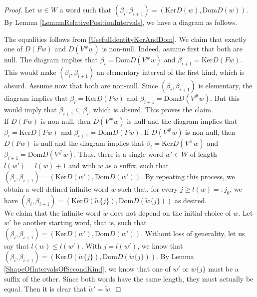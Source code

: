 \documentclass[12pt]{amsart}
\theoremstyle{definition}
\renewcommand{\tilde}{\widetilde}
\newcommand{\<}{\langle}   %
\renewcommand{\>}{\rangle} %
\begin{document}
\begin{proof}
    Let $w \in W$ a word such that $(\beta_i,\beta_{i+1}) = (\mathrm{Ker}D(w), \mathrm{Dom}D(w))$. By Lemma \ref{LemmaRelativePositionIntervals}, we have a diagram as follows.
    \begin{center}
    \end{center}
    The equalities follows from \eqref{UsefulIdentityKerAndDom}. We claim that exactly one of $D(Fw)$ and $D(V^{\#}w)$ is non-null. Indeed, assume first that both are null. The diagram implies that $\beta_i = \mathrm{Dom}D(V^{\#}w)$ and $\beta_{i+1} = \mathrm{Ker}D(Fw)$. This would make $(\beta_i,\beta_{i+1})$ an elementary interval of the first kind, which is absurd. Assume now that both are non-null. Since $(\beta_i,\beta_{i+1})$ is elementary, the diagram implies that $\beta_i = \mathrm{Ker}D(Fw)$ and $\beta_{i+1} = \mathrm{Dom}D(V^{\#}w)$. But this would imply that $\beta_{i+1} \subseteq  \beta_i$, which is absurd. This proves the claim.\\
    If $D(Fw)$ is non null, then $D(V^{\#}w)$ is null and the diagram implies that $\beta_i = \mathrm{Ker}D(Fw)$ and $\beta_{i+1} = \mathrm{Dom}D(Fw)$. If $D(V^{\#}w)$ is non null, then $D(Fw)$ is null and the diagram implies that $\beta_i = \mathrm{Ker}D(V^{\#}w)$ and $\beta_{i+1} = \mathrm{Dom}D(V^{\#}w)$. Thus, there is a single word $w' \in  W$ of length $l(w') = l(w) + 1$ and with $w$ as a suffix, such that $(\beta_i,\beta_{i+1}) = (\mathrm{Ker}D(w'), \mathrm{Dom}D(w'))$. By repeating this process, we obtain a well-defined infinite word $\tilde w$ such that, for every $j \geq l(w) =: j_0$, we have $(\beta_i,\beta_{i+1}) = (\mathrm{Ker} D(\tilde w\{j\}), \mathrm{Dom} D(\tilde w\{j\}))$ as desired.\\
    We claim that the infinite word $\tilde w$ does not depend on the initial choice of $w$. Let $w'$ be another starting word, that is, such that $(\beta_i,\beta_{i+1}) = (\mathrm{Ker}D(w'), \mathrm{Dom}D(w'))$. Without loss of generality, let us say that $l(w) \leq l(w')$. With $j = l(w')$, we know that $(\beta_i,\beta_{i+1}) = (\mathrm{Ker} D(\tilde w\{j\}), \mathrm{Dom} D(\tilde w\{j\}))$. By Lemma \ref{ShapeOfIntervalsOfSecondKind}, we know that one of $w'$ or $w\{j\}$ must be a suffix of the other. Since both words have the same length, they must actually be equal. Then it is clear that $\tilde{w}' = \tilde w$.
\end{proof}
\end{document}
